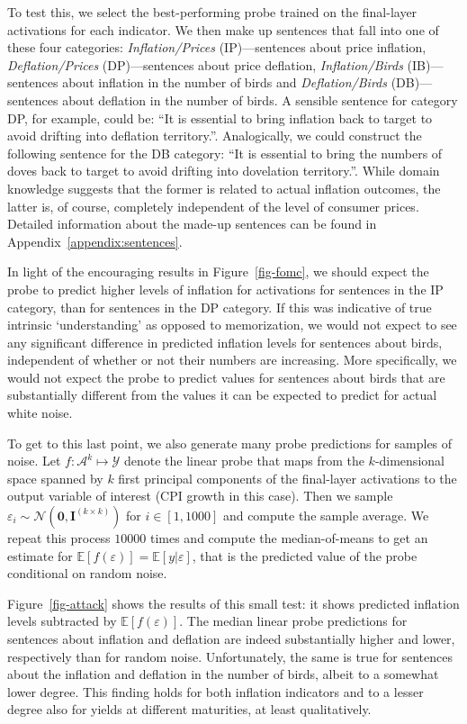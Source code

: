 To test this, we select the best-performing probe trained on the final-layer activations for each indicator. We then make up sentences that fall into one of these four categories: \emph{Inflation/Prices} (IP)---sentences about price inflation, \emph{Deflation/Prices} (DP)---sentences about price deflation, \emph{Inflation/Birds} (IB)---sentences about inflation in the number of birds and \emph{Deflation/Birds} (DB)---sentences about deflation in the number of birds. A sensible sentence for category DP, for example, could be: ``It is essential to bring inflation back to target to avoid drifting into deflation territory.''. Analogically, we could construct the following sentence for the DB category: ``It is essential to bring the numbers of doves back to target to avoid drifting into dovelation territory.''. While domain knowledge suggests that the former is related to actual inflation outcomes, the latter is, of course, completely independent of the level of consumer prices. Detailed information about the made-up sentences can be found in Appendix~\ref{appendix:sentences}.

In light of the encouraging results in Figure~\ref{fig-fomc}, we should expect the probe to predict higher levels of inflation for activations for sentences in the IP category, than for sentences in the DP category. If this was indicative of true intrinsic `understanding' as opposed to memorization, we would not expect to see any significant difference in predicted inflation levels for sentences about birds, independent of whether or not their numbers are increasing. More specifically, we would not expect the probe to predict values for sentences about birds that are substantially different from the values it can be expected to predict for actual white noise. 

To get to this last point, we also generate many probe predictions for samples of noise. Let \(f: \mathcal{A}^k \mapsto \mathcal{Y}\) denote the linear probe that maps from the \(k\)-dimensional space spanned by \(k\) first principal components of the final-layer activations to the output variable of interest (CPI growth in this case). Then we sample \(\varepsilon_i \sim \mathcal{N}(\mathbf{0},\mathbf{I}^{(k \times k)})\) for \(i \in [1,1000]\) and compute the sample average. We repeat this process \(10000\) times and compute the median-of-means to get an estimate for \(\mathbb{E}[f(\varepsilon)]=\mathbb{E}[y|\varepsilon]\), that is the predicted value of the probe conditional on random noise.

Figure~\ref{fig-attack} shows the results of this small test: it shows predicted inflation levels subtracted by \(\mathbb{E}[f(\varepsilon)]\). The median linear probe predictions for sentences about inflation and deflation are indeed substantially higher and lower, respectively than for random noise. Unfortunately, the same is true for sentences about the inflation and deflation in the number of birds, albeit to a somewhat lower degree. This finding holds for both inflation indicators and to a lesser degree also for yields at different maturities, at least qualitatively.

